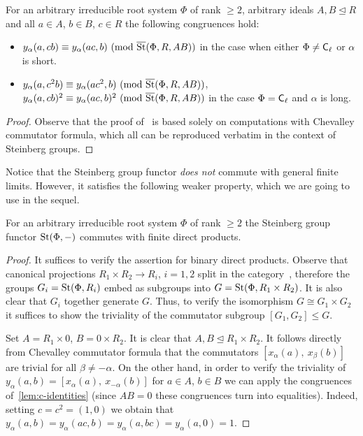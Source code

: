 \documentclass[oneside, 11pt]{amsart} \pdfoutput=1
\begin{document}
\begin{lemma} \label{lem:c-identities} For an arbitrary irreducible root system $\Phi$ of rank $\geq 2$, arbitrary ideals $A, B \trianglelefteq R$ and all $a \in A$, $b \in B$, $c \in R$ the following congruences hold:
\begin{itemize}
 \item $y_\alpha(a, cb) \equiv y_\alpha(ac, b)\ (\mathrm{mod}\ \overline{\mathop{\mathrm{St}}\nolimits}(\Phi, R, AB))$ in the case when either $\Phi \neq \mathsf{C}_{\ell}$ or $\alpha$ is short.
 \item $y_\alpha(a, c^2b) \equiv y_\alpha(ac^2, b)\ (\mathrm{mod}\ \overline{\mathop{\mathrm{St}}\nolimits}(\Phi, R, AB))$, $y_\alpha(a, cb)^2 \equiv y_\alpha(ac, b)^2\ (\mathrm{mod}\ \overline{\St}(\Phi, R, AB))$ in the case $\Phi = \mathsf{C}_{\ell}$ and $\alpha$ is long.
\end{itemize} \end{lemma}
\begin{proof}
 Observe that the proof of~\cite[Theorem~5]{VZ20} is based solely on computations with Chevalley commutator formula, which all can be reproduced verbatim in the context of Steinberg groups.
\end{proof}

Notice that the Steinberg group functor {\it does not} commute with general finite limits. However, it satisfies the following weaker property, which we are going to use in the sequel.
\begin{lemma} \label{lem:fprod} For an arbitrary irreducible root system $\Phi$ of rank $\geq 2$ the Steinberg group functor $\mathop{\mathrm{St}}\nolimits(\Phi, -)$ commutes with finite direct products. \end{lemma}
\begin{proof} 
It suffices to verify the assertion for binary direct products.
Observe that canonical projections $R_1 \times R_2 \to R_i$, $i=1,2$ split in the category~, therefore the groups $G_i = \mathop{\mathrm{St}}\nolimits(\Phi, R_i)$ embed as subgroups into $G = \mathop{\mathrm{St}}\nolimits(\Phi, R_1 \times R_2)$. It is also clear that $G_i$ together generate $G$. Thus, to verify the isomorphism $G \cong G_1 \times G_2$ it suffices to show the triviality of the commutator subgroup $[G_1, G_2] \leq G$.

Set $A = R_1\times 0$, $B = 0 \times R_2$. It is clear that $A, B \trianglelefteq R_1 \times R_2$. 
It follows directly from Chevalley commutator formula that the commutators $[x_{\alpha}(a),\ x_\beta(b)]$ are trivial for all $\beta \neq -\alpha$. On the other hand, in order to verify the triviality of $y_\alpha(a, b) = [x_{\alpha}(a),\ x_{-\alpha}(b)]$ for $a\in A$, $b\in B$ we can apply the congruences of~\cref{lem:c-identities} (since $AB=0$ these congruences turn into equalities).
Indeed, setting $c = c^2 = (1, 0)$ we obtain that $y_\alpha(a, b) = y_\alpha(ac, b) = y_\alpha(a, bc) = y_\alpha(a, 0) = 1$. \end{proof}
\end{document}
